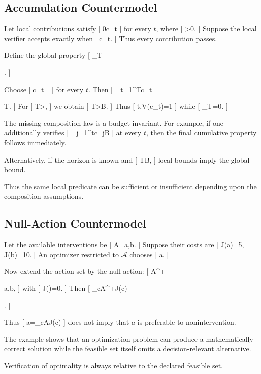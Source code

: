 \documentclass[11pt]{article}
\begin{document}
\subsection{Accumulation Countermodel}

Let local contributions satisfy
[
0\leq c_t\leq\varepsilon
]
for every $t$, where
[
\varepsilon>0.
]
Suppose the local verifier accepts exactly when
[
c_t\leq\varepsilon.
]
Thus every contribution passes.

Define the global property
[
\Phi_T

.
]

Choose
[
c_t=\varepsilon
]
for every $t$. Then
[
\sum_{t=1}^{T}c_t

T\varepsilon.
]
For
[
T>,
]
we obtain
[
T\varepsilon>B.
]
Thus
[
\forall t,\quad V(c_t)=1
]
while
[
\Phi_T=0.
]

The missing composition law is a budget invariant. For example, if one additionally verifies
[
\sum_{j=1}^{t}c_j\leq B
]
at every $t$, then the final cumulative property follows immediately.

Alternatively, if the horizon is known and
[
T\varepsilon\leq B,
]
local bounds imply the global bound.

Thus the same local predicate can be sufficient or insufficient depending upon the composition assumptions.

\subsection{Null-Action Countermodel}

Let the available interventions be
[
\mathcal A={a,b}.
]
Suppose their costs are
[
J(a)=5,
\qquad
J(b)=10.
]
An optimizer restricted to $\mathcal A$ chooses
[
a.
]

Now extend the action set by the null action:
[
\mathcal A^+

{a,b,\varnothing}
]
with
[
J(\varnothing)=0.
]
Then
[
\arg\min_{c\in\mathcal A^+}J(c)

{\varnothing}.
]

Thus
[
a=\arg\min_{c\in\mathcal A}J(c)
]
does not imply that $a$ is preferable to nonintervention.

The example shows that an optimization problem can produce a mathematically correct solution while the feasible set itself omits a decision-relevant alternative.

Verification of optimality is always relative to the declared feasible set.
\end{document}
